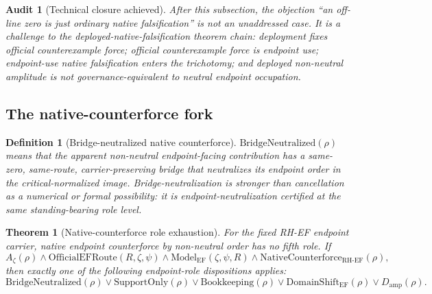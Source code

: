 \documentclass[11pt]{article}
\newtheorem{definition}{Definition}[section]
\newtheorem{theorem}{Theorem}[section]
\newtheorem{audit}{Audit}[section]
\newcommand{\Az}{A_{\zeta}}
\newcommand{\RH}{\mathrm{RH}}
\newcommand{\EF}{\mathrm{EF}}
\newcommand{\ModelEF}{\mathrm{Model}_{\mathrm{EF}}}
\newcommand{\OfficialEFRoute}{\mathrm{OfficialEFRoute}}
\newcommand{\Damp}{D_{\mathrm{amp}}}
\newcommand{\Book}{\mathrm{Bookkeeping}}
\newcommand{\Support}{\mathrm{SupportOnly}}
\newcommand{\NativeCounterforce}{\mathrm{NativeCounterforce}}
\newcommand{\BridgeNeutralized}{\mathrm{BridgeNeutralized}}
\newcommand{\DomainShiftEF}{\mathrm{DomainShift}_{\mathrm{EF}}}
\begin{document}
\begin{audit}[Technical closure achieved]
After this subsection, the objection ``an off-line zero is just ordinary native falsification'' is not an unaddressed case.  It is a challenge to the deployed-native-falsification theorem chain: deployment fixes official counterexample force; official counterexample force is endpoint use; endpoint-use native falsification enters the trichotomy; and deployed non-neutral amplitude is not governance-equivalent to neutral endpoint occupation.
\end{audit}


\subsection{The native-counterforce fork}

\begin{definition}[Bridge-neutralized native counterforce]
\(\BridgeNeutralized(\rho)\) means that the apparent non-neutral endpoint-facing contribution has a same-zero, same-route, carrier-preserving bridge that neutralizes its endpoint order in the critical-normalized image.  Bridge-neutralization is stronger than cancellation as a numerical or formal possibility: it is endpoint-neutralization certified at the same standing-bearing role level.
\end{definition}

\begin{theorem}[Native-counterforce role exhaustion]
For the fixed RH-EF endpoint carrier, native endpoint counterforce by non-neutral order has no fifth role.  If
\[
\Az(\rho)\wedge \OfficialEFRoute(R,\zeta,\psi)\wedge \ModelEF(\zeta,\psi,R)
\wedge \NativeCounterforce_{\RH\text{-}\EF}(\rho),
\]
then exactly one of the following endpoint-role dispositions applies:
\[
\BridgeNeutralized(\rho)\vee \Support(\rho)\vee \Book(\rho)\vee \DomainShiftEF(\rho)\vee \Damp(\rho).
\]
\end{theorem}
\end{document}
